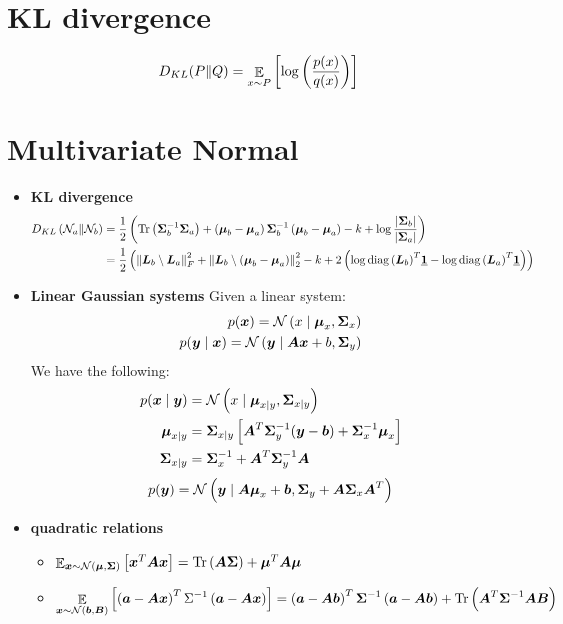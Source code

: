 \documentclass{article}
\begin{document}


\section{KL divergence}
\begin{align*}
  D_{KL} (P \| Q) = \expected{x \sim P}{ \func{\log}{\dfrac{p(x)}{q(x)}}}
\end{align*}

\section{Multivariate Normal}
\begin{itemize}
  \item \textbf{KL divergence}
  \begin{align*}
    \func{D_{KL}}{{\cal N}_a \| {\cal N}_b }
      & = \dfrac{1}{2}\group{
        \Tr{\vSigma_b^{-1} \vSigma_a}
        + \group{\vmu_b - \vmu_a} \vSigma_b^{-1} \group{\vmu_b - \vmu_a}
        - k + \log{\dfrac{\abs{\vSigma_b}}{\abs{\vSigma_a}}}
        } \\
      & = \dfrac{1}{2}\group{
        \fnorm{\vL_b \solve \vL_a}^2
        + \ltwogroup{\vL_b \solve \group{\vmu_b - \vmu_a}}^2
        - k + 2\group{  \log{\func{\diag}{{\vL_b}}^T \ones}
                      - \log{\func{\diag}{{\vL_a}}^T \ones} }
        }
  \end{align*}
  \item \textbf{Linear Gaussian systems}
    Given a linear system:
    \begin{align*}
      p(\vx) = \normal{x \given \vmu_x, \vSigma_x} \\
      p(\vy \given \vx) = \normal{\vy \given \vA \vx + b, \vSigma_y}
    \end{align*}
    We have the following:
    \begin{align*}
      p(\vx \given \vy) &= \normal{x \given \vmu_{x \given y}, \vSigma_{x \given y}} \\
      \vmu_{x \given y} &= \vSigma_{x \given y} \sgroup{\vA^T \vSigma_y^{-1} (\vy - \vb) + \vSigma_x^{-1} \vmu_x}\\
      \vSigma_{x \given y} &= \vSigma_x^{-1} + \vA^T \vSigma_y^{-1} \vA
    \end{align*}
    \begin{align*}
      p(\vy) = \normal{\vy \given \vA \vmu_x + \vb,
                       \vSigma_y + \vA \vSigma_x \vA^T}
    \end{align*}
  \item \textbf{quadratic relations}
    \begin{itemize}
      \item $\expected{\vx \sim \normal{\vmu, \vSigma}}{\vx^T \vA \vx}
              = \Tr{\vA \vSigma} + \vmu^T \vA \vmu$
      \item
      $$\expected{\vx \sim \normal{\vb, \vB}}{
        \group{\va - \vA \vx}^T \Sigma^{-1} \group{\va - \vA \vx}}
        = \group{\va - \vA \vb}^T \vSigma^{-1} \group{\va - \vA \vb}
          + \Tr{\vA^T \vSigma^{-1} \vA \vB}$$
    \end{itemize}

\end{itemize}
\end{document}
